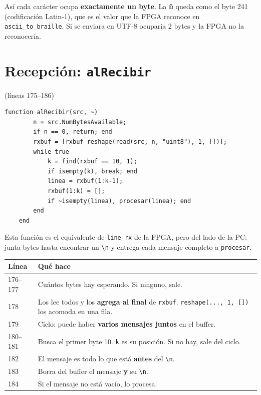 \documentclass[11pt,a4paper]{article}
\newcommand{\linea}[1]{\textcolor{gris}{\small(líneas #1)}}
\newcommand{\cod}[1]{\texttt{#1}}
\begin{document}
\begin{ojo}
Así cada carácter ocupa \textbf{exactamente un byte}. La \textbf{ñ} queda como el
byte 241 (codificación Latin-1), que es el valor que la FPGA reconoce en
\cod{ascii\_to\_braille}. Si se enviara en UTF-8 ocuparía 2 bytes y la FPGA no la
reconocería.
\end{ojo}

\section{Recepción: \texttt{alRecibir}}
\linea{175--186}

\begin{lstlisting}[firstnumber=175]
    function alRecibir(src, ~)
        n = src.NumBytesAvailable;
        if n == 0, return; end
        rxbuf = [rxbuf reshape(read(src, n, "uint8"), 1, [])];
        while true
            k = find(rxbuf == 10, 1);
            if isempty(k), break; end
            linea = rxbuf(1:k-1);
            rxbuf(1:k) = [];
            if ~isempty(linea), procesar(linea); end
        end
    end
\end{lstlisting}

\begin{idea}
Esta función es el equivalente de \cod{line\_rx} de la FPGA, pero del lado de la
PC: junta bytes hasta encontrar un \cod{\textbackslash n} y entrega cada mensaje
completo a \cod{procesar}.
\end{idea}

\begin{center}
\begin{tabular}{l >{\raggedright\arraybackslash}p{12cm}}
\toprule
\textbf{Línea} & \textbf{Qué hace} \\
\midrule
176--177 & Cuántos bytes hay esperando. Si ninguno, sale. \\
178 & Los lee todos y los \textbf{agrega al final} de \cod{rxbuf}. \cod{reshape(..., 1, [])} los acomoda en una fila. \\
179 & Ciclo: puede haber \textbf{varios mensajes juntos} en el buffer. \\
180--181 & Busca el primer byte 10. \cod{k} es su posición. Si no hay, sale del ciclo. \\
182 & El mensaje es todo lo que está \textbf{antes} del \cod{\textbackslash n}. \\
183 & Borra del buffer el mensaje \textbf{y} su \cod{\textbackslash n}. \\
184 & Si el mensaje no está vacío, lo procesa. \\
\bottomrule
\end{tabular}
\end{center}
\end{document}
